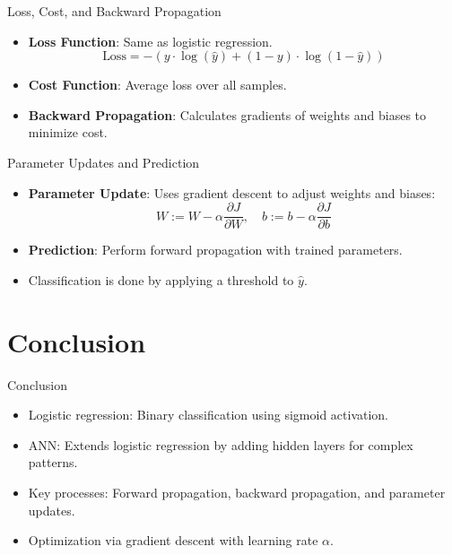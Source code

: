 \documentclass{beamer}
\begin{document}
\begin{frame}{Loss, Cost, and Backward Propagation}
    \begin{itemize}
        \item \textbf{Loss Function}: Same as logistic regression.
        $$
        \text{Loss} = - \left( y \cdot \log(\hat{y}) + (1 - y) \cdot \log(1 - \hat{y}) \right)
        $$
        \item \textbf{Cost Function}: Average loss over all samples.
        \item \textbf{Backward Propagation}: Calculates gradients of weights and biases to minimize cost.
    \end{itemize}
\end{frame}

\begin{frame}{Parameter Updates and Prediction}
    \begin{itemize}
        \item \textbf{Parameter Update}: Uses gradient descent to adjust weights and biases:
        $$
        W := W - \alpha \frac{\partial J}{\partial W}, \quad b := b - \alpha \frac{\partial J}{\partial b}
        $$
        \item \textbf{Prediction}: Perform forward propagation with trained parameters.
        \item Classification is done by applying a threshold to $\hat{y}$.
    \end{itemize}
\end{frame}

\section{Conclusion}
\begin{frame}{Conclusion}
    \begin{itemize}
        \item Logistic regression: Binary classification using sigmoid activation.
        \item ANN: Extends logistic regression by adding hidden layers for complex patterns.
        \item Key processes: Forward propagation, backward propagation, and parameter updates.
        \item Optimization via gradient descent with learning rate $\alpha$.
    \end{itemize}
\end{frame}
\end{document}
